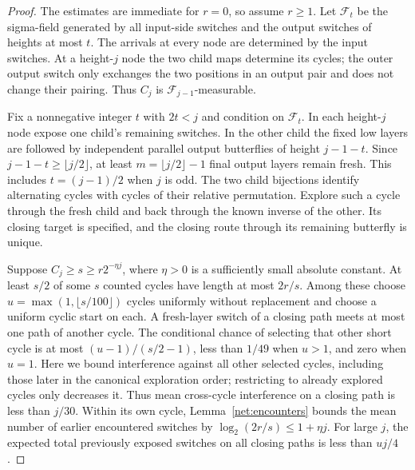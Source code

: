 \begin{proof}
The estimates are immediate for $r=0$, so assume $r\ge1$.
Let $\mathcal F_t$ be the sigma-field generated by all input-side
switches and the output switches of heights at most $t$.
The arrivals at every node are determined by the input switches.
At a height-$j$ node the two child maps determine its cycles; the
outer output switch only exchanges the two positions in an output
pair and does not change their pairing.  Thus $C_j$ is
$\mathcal F_{j-1}$-measurable.

Fix a nonnegative integer $t$ with $2t<j$ and condition on $\mathcal F_t$.
In each height-$j$ node expose one child's remaining switches.
In the other child the fixed low layers are followed by independent
parallel output butterflies of height $j-1-t$.  Since
$j-1-t\ge\lfloor j/2\rfloor$, at least
$m=\lfloor j/2\rfloor-1$ final output layers remain fresh.
This includes $t=(j-1)/2$ when $j$ is odd.
The two child bijections identify alternating cycles with cycles of
their relative permutation. Explore such a cycle through the fresh
child and back through the known inverse of the other. Its closing
target is specified, and the closing route through its remaining
butterfly is unique.

Suppose $C_j\ge s\ge r2^{-\eta j}$, where $\eta>0$ is a sufficiently small absolute constant. At least $s/2$ of some $s$ counted cycles have length at most $2r/s$. Among these choose $u=\max(1,\lfloor s/100\rfloor)$ cycles uniformly without replacement and choose a uniform cyclic start on each. A fresh-layer switch of a closing path meets at most one path of another cycle. The conditional chance of selecting that other short cycle is at most $(u-1)/(s/2-1)$, less than $1/49$ when $u>1$, and zero when $u=1$. Here we bound interference against all other selected cycles, including those later in the canonical exploration order; restricting to already explored cycles only decreases it. Thus mean cross-cycle interference on a closing path is less than $j/30$. Within its own cycle, Lemma~\ref{net:encounters} bounds the mean number of earlier encountered switches by $\log_2(2r/s)\le1+\eta j$. For large $j$, the expected total previously exposed switches on all closing paths is less than $uj/4$.


\end{proof}
